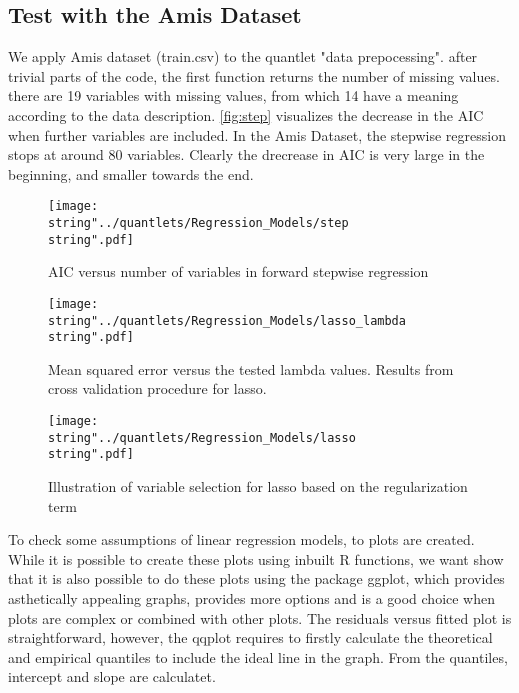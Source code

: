 
\subsection{Test with the Amis Dataset}
We apply Amis dataset (train.csv) to the quantlet "data prepocessing".
after trivial parts of the code, the first function returns the number of missing values.  there are 19 variables with missing values, from which 14 have a meaning according to the data description. 
\autoref{fig:step} visualizes the decrease in the AIC when further variables are included. In the Amis Dataset, the stepwise regression stops at around 80 variables. Clearly the drecrease in AIC is very large in the beginning, and smaller towards the end. 



\begin{figure}
  \centering
\texttt{[image: \\string"../quantlets/Regression\_Models/step\\string".pdf]}
  \caption{AIC versus number of variables in forward stepwise regression}\label{fig:step}
\end{figure}


\begin{figure}
  \centering
\texttt{[image: \\string"../quantlets/Regression\_Models/lasso\_lambda\\string".pdf]}
  \caption{Mean squared error versus the tested lambda values. Results from cross validation procedure for lasso.}\label{fig:step}
\end{figure}


\begin{figure}
  \centering
\texttt{[image: \\string"../quantlets/Regression\_Models/lasso\\string".pdf]}
  \caption{Illustration of variable selection for lasso based on the regularization term}\label{fig:step}
\end{figure}






To check some assumptions of linear regression models, to plots are
created. While it is possible to create these plots using inbuilt
R functions, we want show that it is also possible to do these plots
using the package ggplot, which provides asthetically appealing graphs,
provides more options and is a good choice when plots are complex
or combined with other plots. The residuals versus fitted plot is
straightforward, however, the qqplot requires to firstly calculate
the theoretical and empirical quantiles to include the ideal line
in the graph. From the quantiles, intercept and slope are calculatet. 
